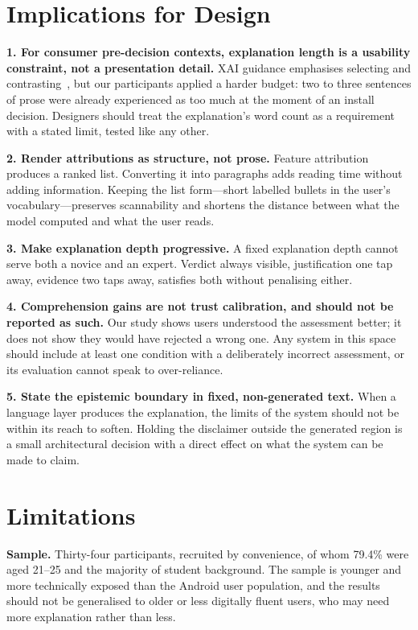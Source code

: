 \documentclass[sigconf]{acmart}
\begin{document}
\section{Implications for Design}

\textbf{1. For consumer pre-decision contexts, explanation length is a
usability constraint, not a presentation detail.} XAI guidance emphasises
selecting and contrasting~\cite{miller2019explanation}, but our
participants applied a harder budget: two to three sentences of prose were
already experienced as too much at the moment of an install decision.
Designers should treat the explanation's word count as a requirement with a
stated limit, tested like any other.

\textbf{2. Render attributions as structure, not prose.} Feature
attribution produces a ranked list. Converting it into paragraphs adds
reading time without adding information. Keeping the list form---short
labelled bullets in the user's vocabulary---preserves scannability and
shortens the distance between what the model computed and what the user
reads.

\textbf{3. Make explanation depth progressive.} A fixed explanation depth
cannot serve both a novice and an expert. Verdict always visible,
justification one tap away, evidence two taps away, satisfies both without
penalising either.

\textbf{4. Comprehension gains are not trust calibration, and should not be
reported as such.} Our study shows users understood the assessment better;
it does not show they would have rejected a wrong one. Any system in this
space should include at least one condition with a deliberately incorrect
assessment, or its evaluation cannot speak to over-reliance.

\textbf{5. State the epistemic boundary in fixed, non-generated text.} When
a language layer produces the explanation, the limits of the system should
not be within its reach to soften. Holding the disclaimer outside the
generated region is a small architectural decision with a direct effect on
what the system can be made to claim.

\section{Limitations}

\textbf{Sample.} Thirty-four participants, recruited by convenience, of
whom 79.4\% were aged 21--25 and the majority of student background. The
sample is younger and more technically exposed than the Android user
population, and the results should not be generalised to older or less
digitally fluent users, who may need more explanation rather than less.
\end{document}
